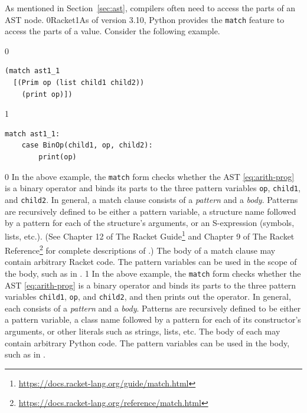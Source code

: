 \documentclass[7x10,nocrop]{TimesAPriori_MIT}%
\def\racketEd{0}
\def\pythonEd{1}
\def\edition{0}
\newcommand{\racket}[1]{{\if\edition\racketEd{#1}\fi}}
\newcommand{\python}[1]{{\if\edition\pythonEd #1\fi}}
\begin{document}
As mentioned in Section~\ref{sec:ast}, compilers often need to access
the parts of an AST node. \racket{Racket}\python{As of version 3.10, Python} provides the
\texttt{match} feature to access the parts of a value.
Consider the following example.  
\begin{center}
\begin{minipage}{0.5\textwidth}
{\if\edition\racketEd
\begin{lstlisting}
(match ast1_1
  [(Prim op (list child1 child2))
    (print op)])
\end{lstlisting}
\fi}
{\if\edition\pythonEd
\begin{lstlisting}
match ast1_1:
    case BinOp(child1, op, child2):
        print(op)
\end{lstlisting}
\fi}  
\end{minipage}
\end{center}

{\if\edition\racketEd
%
In the above example, the \texttt{match} form checks whether the AST
\eqref{eq:arith-prog} is a binary operator and binds its parts to the
three pattern variables \texttt{op}, \texttt{child1}, and
\texttt{child2}. In general, a match clause consists of a
\emph{pattern} and a \emph{body}. Patterns are
recursively defined to be either a pattern variable, a structure name
followed by a pattern for each of the structure's arguments, or an
S-expression (symbols, lists, etc.).  (See Chapter 12 of The Racket
Guide\footnote{\url{https://docs.racket-lang.org/guide/match.html}}
and Chapter 9 of The Racket
Reference\footnote{\url{https://docs.racket-lang.org/reference/match.html}}
for complete descriptions of .)
%
The body of a match clause may contain arbitrary Racket code.  The
pattern variables can be used in the scope of the body, such as
 in .
%
\fi}
%
%
{\if\edition\pythonEd
%  
In the above example, the \texttt{match} form checks whether the AST
\eqref{eq:arith-prog} is a binary operator and binds its parts to the
three pattern variables \texttt{child1}, \texttt{op}, and
\texttt{child2}, and then prints out the operator. In general, each
 consists of a \emph{pattern} and a
\emph{body}. Patterns are recursively defined
to be either a pattern variable, a class name followed by a pattern
for each of its constructor's arguments, or other literals such as
strings, lists, etc.
%
The body of each  may contain arbitrary Python code. The
pattern variables can be used in the body, such as  in
.
%
\fi}
\end{document}
